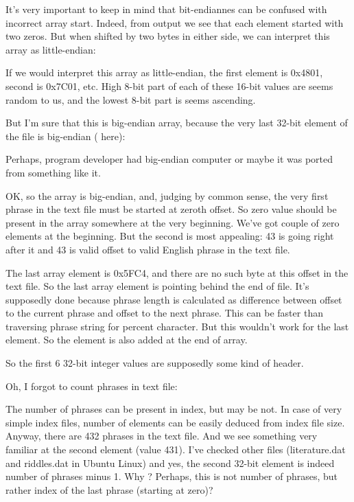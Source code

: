 It's very important to keep in mind that bit-endiannes can be confused with incorrect array start.
Indeed, from  output we see that each element started with two zeros.
But when shifted by two bytes in either side, we can interpret this array as little-endian:



If we would interpret this array as little-endian, the first element is 0x4801, second is 0x7C01, etc.
High 8-bit part of each of these 16-bit values are seems random to us, and the lowest 8-bit part is seems ascending.

But I'm sure that this is big-endian array, because the very last 32-bit element of the file is big-endian 
( here):



Perhaps,  program developer had big-endian computer or maybe it was ported from something like it.

OK, so the array is big-endian, and, judging by common sense, the very first phrase in the text file must be started at zeroth offset. So zero value should be present in the array somewhere at the very beginning.
We've got couple of zero elements at the beginning. But the second is most appealing: 43 is going right after it and 43 is valid offset to valid English phrase in the text file.

The last array element is 0x5FC4, and there are no such byte at this offset in the text file.
So the last array element is pointing behind the end of file.
It's supposedly done because phrase length is calculated as difference between offset to the current phrase
and offset to the next phrase. 
This can be faster than traversing phrase string for percent character.
But this wouldn't work for the last element.
So the  element is also added at the end of array.

So the first 6 32-bit integer values are supposedly some kind of header.

Oh, I forgot to count phrases in text file:



The number of phrases can be present in index, but may be not.
In case of very simple index files, number of elements can be easily deduced from index file size.
Anyway, there are 432 phrases in the text file.
And we see something very familiar at the second element (value 431).
I've checked other files (literature.dat and riddles.dat in Ubuntu Linux) and yes, the second 32-bit element is indeed number of phrases minus 1.
Why ? Perhaps, this is not number of phrases, but rather index of the last phrase (starting at zero)?

